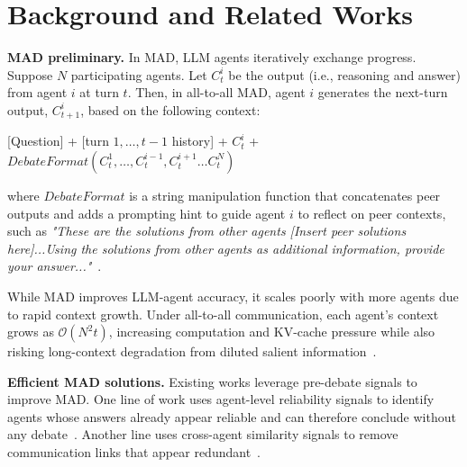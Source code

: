 \section{Background and Related Works}

\noindent\textbf{MAD preliminary.} In MAD, LLM agents iteratively exchange progress. Suppose $N$ participating agents. Let $C_{t}^i$ be the output (i.e., reasoning and answer) from agent $i$ at turn $t$. Then, in all-to-all MAD, agent $i$ generates the next-turn output, $C_{t+1}^i$, based on the following context:

[Question] + [turn $1,\dots,t-1$ history] + $C_t^i$ + $DebateFormat(C_{t}^1,\dots,C_t^{i-1}, C_t^{i+1}\dots C_t^N)$

where $DebateFormat$ is a string manipulation function that concatenates peer outputs and adds a prompting hint to guide agent $i$ to reflect on peer contexts, such as \textit{"These are the solutions from other agents [Insert peer solutions here]...Using the solutions from other agents as additional information, provide your answer..."}~\citep{Du2024Improving}.

While MAD improves LLM-agent accuracy, it scales poorly with more agents due to rapid context growth. Under all-to-all communication, each agent’s context grows as $\mathcal{O}(N^2t)$, increasing computation and KV-cache pressure while also risking long-context degradation from diluted salient information~\citep{Liu2024Lost, Laban2026Llm}.

\noindent\textbf{Efficient MAD solutions.} Existing works leverage pre-debate signals to improve MAD. One line of work uses agent-level reliability signals to identify agents whose answers already appear reliable and can therefore conclude without any debate~\citep{Chen2025Sid, Eo2025Debate}. Another line uses cross-agent similarity signals to remove communication links that appear redundant~\citep{Zeng2025S2Mad, Liu2025Groupdebate, Zhu2026Demystifying}.

